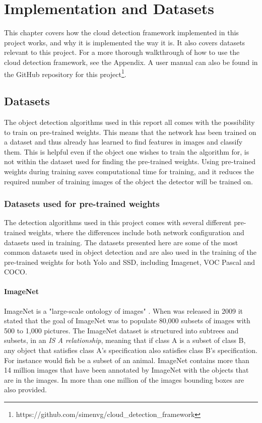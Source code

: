 
\chapter{Implementation and Datasets}

This chapter covers how the cloud detection framework implemented in this project works, and why it is implemented the way it is. It also covers datasets relevant to this project. For a more thorough walkthrough of how to use the cloud detection framework, see the Appendix. A user manual can also be found in the GitHub repository for this project\footnote{https://github.com/simenvg/cloud\_detection\_framework}. 

\section{Datasets}
The object detection algorithms used in this report all comes with the possibility to train on pre-trained weights. This means that the network has been trained on a dataset and thus already has learned to find features in images and classify them. This is helpful even if the object one wishes to train the algorithm for, is not within the dataset used for finding the pre-trained weights. Using pre-trained weights during training saves computational time for training, and it reduces the required number of training images of the object the detector will be trained on.

\vspace{3mm}

\subsection{Datasets used for pre-trained weights}
The detection algorithms used in this project comes with several different pre-trained weights, where the differences include both network configuration and datasets used in training. The datasets presented here are some of the most common datasets used in object detection and are also used in the training of the pre-trained weights for both Yolo and SSD, including Imagenet, VOC Pascal and COCO.


\subsubsection{ImageNet}
ImageNet is a "large-scale ontology of images" \citep{Deng2009}. When \citep{Deng2009} was released in 2009 it stated that the goal of ImageNet was to populate 80,000 subsets of images with 500 to 1,000 pictures. The ImageNet dataset is structured into subtrees and subsets, in an \textit{IS A relationship}, meaning that if class A is a subset of class B, any object that satisfies class A's specification also satisfies class B's specification. For instance would fish be a subset of an animal. ImageNet contains more than 14 million images that have been annotated by ImageNet with the objects that are in the images. In more than one million of the images bounding boxes are also provided. 


